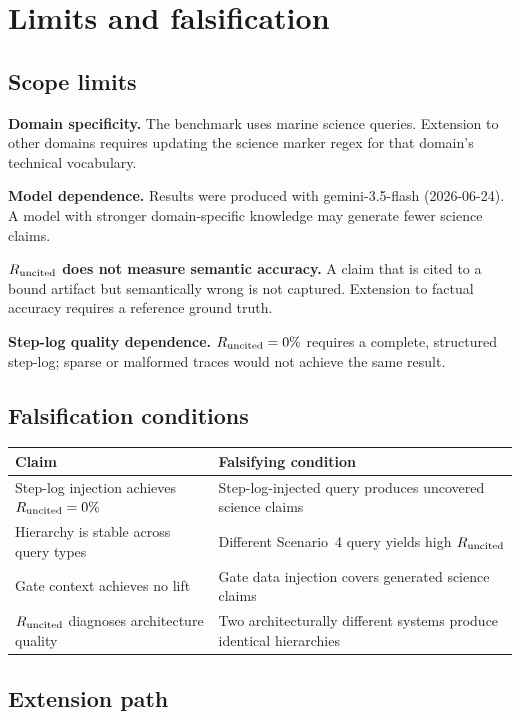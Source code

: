\section{Limits and falsification}

\subsection{Scope limits}

\textbf{Domain specificity.} The benchmark uses marine science queries. Extension to other domains
requires updating the science marker regex for that domain's technical vocabulary.

\textbf{Model dependence.} Results were produced with gemini-3.5-flash (2026-06-24). A model with
stronger domain-specific knowledge may generate fewer science claims.

\textbf{$R_{\mathrm{uncited}}$ does not measure semantic accuracy.} A claim that is cited to a bound artifact
but semantically wrong is not captured. Extension to factual accuracy requires a reference
ground truth.

\textbf{Step-log quality dependence.} $R_{\mathrm{uncited}} = 0\%$ requires a complete, structured step-log;
sparse or malformed traces would not achieve the same result.

\subsection{Falsification conditions}

\begin{center}
\small
\begin{tabular}{@{}p{4.5cm}p{3.8cm}@{}}
\toprule
Claim & Falsifying condition \\
\midrule
Step-log injection achieves $R_{\mathrm{uncited}} = 0\%$ & Step-log-injected query produces uncovered science claims \\
Hierarchy is stable across query types & Different Scenario~4 query yields high $R_{\mathrm{uncited}}$ \\
Gate context achieves no lift & Gate data injection covers generated science claims \\
$R_{\mathrm{uncited}}$ diagnoses architecture quality & Two architecturally different systems produce identical hierarchies \\
\bottomrule
\end{tabular}
\end{center}

\subsection{Extension path}

